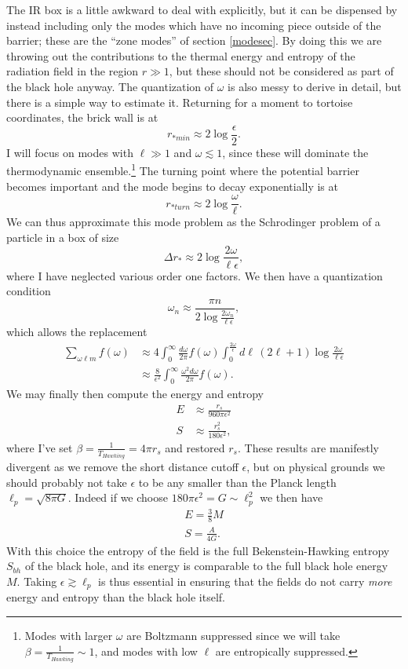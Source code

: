 \documentclass[12pt]{article}
\newcommand{\be}{\begin{equation}}
\newcommand{\ee}{\end{equation}}
\begin{document}
The IR box is a little awkward to deal with explicitly, but it can be dispensed by instead including only the modes which have no incoming piece outside of the barrier; these are the ``zone modes'' of section \ref{modesec}.  By doing this we are throwing out the contributions to the thermal energy and entropy of the radiation field in the region $r\gg 1$, but these should not be considered as part of the black hole anyway.  The quantization of $\omega$ is also messy to derive in detail, but there is a simple way to estimate it.  Returning for a moment to tortoise coordinates, the brick wall is at
\be
r_{*min}\approx 2\log\frac{\epsilon}{2}.
\ee
I will focus on modes with $\ell\gg 1$ and $\omega\lesssim 1$, since these will dominate the thermodynamic ensemble.\footnote{Modes with larger $\omega$ are Boltzmann suppressed since we will take $\beta=\frac{1}{T_{\mathit{Hawking}}}\sim 1$, and modes with low $\ell$ are entropically suppressed.}  The turning point where the potential barrier becomes important and the mode begins to decay exponentially is at
\be
r_{*turn}\approx 2\log \frac{\omega}{\ell}.
\ee
We can thus approximate this mode problem as the Schrodinger problem of a particle in a box of size
\be
\Delta r_*\approx 2\log \frac{2\omega}{\ell \epsilon},
\ee
where I have neglected various order one factors.  We then have a quantization condition
\be
\omega_n\approx \frac{\pi n}{2\log \frac{2\omega_n}{\ell\epsilon}},
\ee
which allows the replacement
\begin{align}\nonumber
\sum_{\omega \ell m}f(\omega)&\approx 4\int_0^\infty \frac{d\omega}{2\pi} f(\omega)\int_0^{\frac{2\omega}{\epsilon}} d\ell\,(2\ell+1) \log\frac{2\omega}{\ell\epsilon}\\
&\approx \frac{8}{\epsilon^2}\int_0^\infty \frac{\omega^2 d\omega}{2\pi}f(\omega).
\end{align}
We may finally then compute the energy and entropy
\begin{align}\nonumber
E&\approx \frac{r_s}{960\pi \epsilon^2}\\
S&\approx\frac{r_s^2}{180\epsilon^2},
\end{align}
where I've set $\beta=\frac{1}{T_{\mathit{Hawking}}}=4\pi r_s$ and restored $r_s$.  These results are manifestly divergent as we remove the short distance cutoff $\epsilon$, but on physical grounds we should probably not take $\epsilon$ to be any smaller than the Planck length $\ell_p=\sqrt{8\pi G}$. Indeed if we choose $180\pi \epsilon^2=G\sim \ell_p^2$ we then have
\begin{align}\nonumber
E=\frac{3}{8} M\\
S=\frac{A}{4G}.
\end{align}
With this choice the entropy of the field is the full Bekenstein-Hawking entropy $S_{\mathit{bh}}$ of the black hole, and its energy is comparable to the full black hole energy $M$.  Taking $\epsilon\gtrsim \ell_p$ is thus essential in ensuring that the fields do not carry \textit{more} energy and entropy than the black hole itself.  
\end{document}
